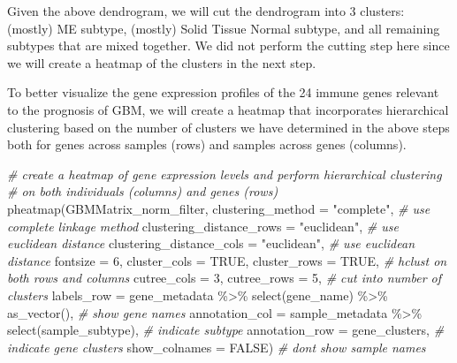 \documentclass[
]{article}
\newenvironment{Shaded}{\begin{snugshade}}{\end{snugshade}}
\newcommand{\AttributeTok}[1]{\textcolor[rgb]{0.77,0.63,0.00}{#1}}
\newcommand{\CommentTok}[1]{\textcolor[rgb]{0.56,0.35,0.01}{\textit{#1}}}
\newcommand{\ConstantTok}[1]{\textcolor[rgb]{0.00,0.00,0.00}{#1}}
\newcommand{\DecValTok}[1]{\textcolor[rgb]{0.00,0.00,0.81}{#1}}
\newcommand{\FunctionTok}[1]{\textcolor[rgb]{0.00,0.00,0.00}{#1}}
\newcommand{\NormalTok}[1]{#1}
\newcommand{\SpecialCharTok}[1]{\textcolor[rgb]{0.00,0.00,0.00}{#1}}
\newcommand{\StringTok}[1]{\textcolor[rgb]{0.31,0.60,0.02}{#1}}
\begin{document}
Given the above dendrogram, we will cut the dendrogram into 3 clusters:
(mostly) ME subtype, (mostly) Solid Tissue Normal subtype, and all
remaining subtypes that are mixed together. We did not perform the
cutting step here since we will create a heatmap of the clusters in the
next step.

\newpage

To better visualize the gene expression profiles of the 24 immune genes
relevant to the prognosis of GBM, we will create a heatmap that
incorporates hierarchical clustering based on the number of clusters we
have determined in the above steps both for genes across samples (rows)
and samples across genes (columns).

\begin{Shaded}
\begin{Highlighting}[]
\CommentTok{\# create a heatmap of gene expression levels and perform hierarchical clustering }
\CommentTok{\# on both individuals (columns) and genes (rows)}
\FunctionTok{pheatmap}\NormalTok{(GBMMatrix\_norm\_filter, }
         \AttributeTok{clustering\_method =} \StringTok{"complete"}\NormalTok{, }\CommentTok{\# use complete linkage method}
         \AttributeTok{clustering\_distance\_rows =} \StringTok{"euclidean"}\NormalTok{, }\CommentTok{\# use euclidean distance}
         \AttributeTok{clustering\_distance\_cols =} \StringTok{"euclidean"}\NormalTok{, }\CommentTok{\# use euclidean distance}
         \AttributeTok{fontsize =} \DecValTok{6}\NormalTok{, }
         \AttributeTok{cluster\_cols =} \ConstantTok{TRUE}\NormalTok{, }\AttributeTok{cluster\_rows =} \ConstantTok{TRUE}\NormalTok{, }\CommentTok{\# hclust on both rows and columns}
         \AttributeTok{cutree\_cols =} \DecValTok{3}\NormalTok{, }\AttributeTok{cutree\_rows =} \DecValTok{5}\NormalTok{, }\CommentTok{\# cut into number of clusters}
         \AttributeTok{labels\_row =}\NormalTok{ gene\_metadata }\SpecialCharTok{\%\textgreater{}\%} \FunctionTok{select}\NormalTok{(gene\_name) }\SpecialCharTok{\%\textgreater{}\%} \FunctionTok{as\_vector}\NormalTok{(), }\CommentTok{\# show gene names}
         \AttributeTok{annotation\_col =}\NormalTok{ sample\_metadata }\SpecialCharTok{\%\textgreater{}\%} \FunctionTok{select}\NormalTok{(sample\_subtype), }\CommentTok{\# indicate subtype}
         \AttributeTok{annotation\_row =}\NormalTok{ gene\_clusters, }\CommentTok{\# indicate gene clusters}
         \AttributeTok{show\_colnames =} \ConstantTok{FALSE}\NormalTok{) }\CommentTok{\# don\textquotesingle{}t show sample names}
\end{Highlighting}
\end{Shaded}
\end{document}
